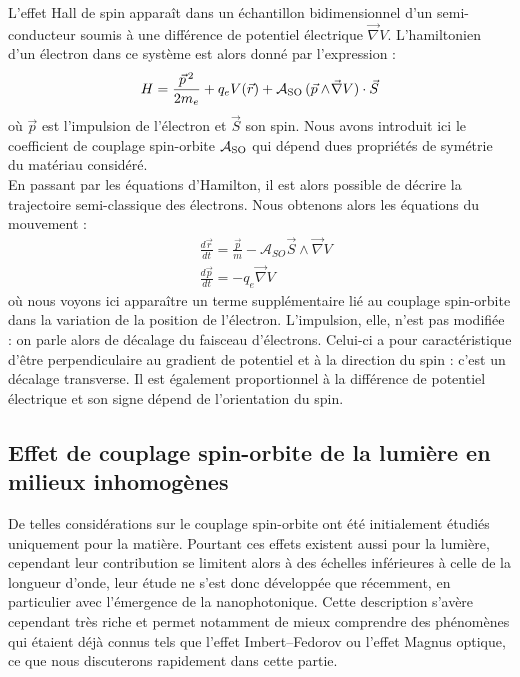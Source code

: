 \documentclass[a4paper,11pt]{article} %
\begin{document}
	L'effet Hall de spin apparaît dans un échantillon bidimensionnel d'un semi-conducteur soumis à une différence de potentiel électrique $\vec{\nabla} V$. L'hamiltonien d'un électron dans ce système est alors donné par l'expression :
	\begin{equation*}
		\label{exp_hamiltonien_SHE}
		H = \frac{\vec{p}^{\, 2}}{2m_e} + q_e V(\vec{r}) + \mathcal{A}_\textup{SO} \, (\vec{p} \wedge \! \vec{\nabla} V) \cdot \vec{S}
	\end{equation*}
	où $ \vec{p} $ est l'impulsion de l'électron et $ \vec{S} $ son spin. Nous avons introduit ici le coefficient de couplage spin-orbite $ \mathcal{A}_\textup{SO} $ qui dépend dues propriétés de symétrie du matériau considéré.\\
	
	En passant par les équations d'Hamilton, il est alors possible de décrire la trajectoire semi-classique des électrons. Nous obtenons alors les équations du mouvement :
	\begin{align}
		& \frac{d\vec{r}}{dt} = \frac{\vec{p}}{m} - \mathcal{A}_{SO} \vec{S} \wedge \vec{\nabla} V \label{eq_mvt_SHE_r} \\
		& \frac{d \vec{p}}{dt} = - q_e \vec{\nabla} V \label{eq_mvt_SHE_p}
	\end{align}
	où nous voyons ici apparaître un terme supplémentaire lié au couplage spin-orbite dans la variation de la position de l'électron. L'impulsion, elle, n'est pas modifiée : on parle alors de décalage du faisceau d'électrons. Celui-ci a pour caractéristique d'être perpendiculaire au gradient de potentiel et à la direction du spin : c'est un décalage transverse. Il est également proportionnel à la différence de potentiel électrique et son signe dépend de l'orientation du spin.
	
	
	\subsection{Effet de couplage spin-orbite de la lumière en milieux inhomogènes}
	De telles considérations sur le couplage spin-orbite ont été initialement étudiés uniquement pour la matière. Pourtant ces effets existent aussi pour la lumière, cependant leur contribution se limitent alors à des échelles inférieures à celle de la longueur d'onde, leur étude ne s'est donc développée que récemment, en particulier avec l'émergence de la nanophotonique. Cette description s'avère cependant très riche et permet notamment de mieux comprendre des phénomènes qui étaient déjà connus tels que l'effet Imbert--Fedorov ou l'effet Magnus optique, ce que nous discuterons rapidement dans cette partie.\\
	
\end{document}

